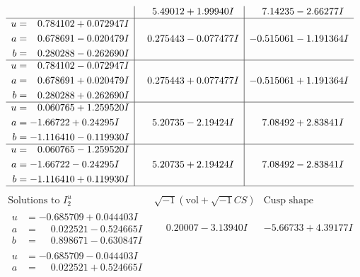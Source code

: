 \documentclass[1p]{elsarticle_modified}
\theoremstyle{definition}
\newcommand{\I}{\sqrt{-1}}
\begin{document}
$$\begin{array}{c|c|c}
 & \phantom{-}5.49012 + 1.99940 I & \phantom{-}7.14235 - 2.66277 I \\ \hline\begin{aligned}
u &= \phantom{-}0.784102 + 0.072947 I \\
a &= \phantom{-}0.678691 - 0.020479 I \\
b &= \phantom{-}0.280288 - 0.262690 I\end{aligned}
 & \phantom{-}0.275443 - 0.077477 I & -0.515061 - 1.191364 I \\ \hline\begin{aligned}
u &= \phantom{-}0.784102 - 0.072947 I \\
a &= \phantom{-}0.678691 + 0.020479 I \\
b &= \phantom{-}0.280288 + 0.262690 I\end{aligned}
 & \phantom{-}0.275443 + 0.077477 I & -0.515061 + 1.191364 I \\ \hline\begin{aligned}
u &= \phantom{-}0.060765 + 1.259520 I \\
a &= -1.66722 + 0.24295 I \\
b &= -1.116410 - 0.119930 I\end{aligned}
 & \phantom{-}5.20735 - 2.19424 I & \phantom{-}7.08492 + 2.83841 I \\ \hline\begin{aligned}
u &= \phantom{-}0.060765 - 1.259520 I \\
a &= -1.66722 - 0.24295 I \\
b &= -1.116410 + 0.119930 I\end{aligned}
 & \phantom{-}5.20735 + 2.19424 I & \phantom{-}7.08492 - 2.83841 I\\
 \hline 
 \end{array}$$\newpage$$\begin{array}{c|c|c}  
\text{Solutions to }I^u_{2}& \I (\text{vol} + \sqrt{-1}CS) & \text{Cusp shape}\\
 \hline 
\begin{aligned}
u &= -0.685709 + 0.044403 I \\
a &= \phantom{-}0.022521 - 0.524665 I \\
b &= \phantom{-}0.898671 - 0.630847 I\end{aligned}
 & \phantom{-}0.20007 - 3.13940 I & -5.66733 + 4.39177 I \\ \hline\begin{aligned}
u &= -0.685709 - 0.044403 I \\
a &= \phantom{-}0.022521 + 0.524665 I \\

\end{aligned}
\end{array}$$
\end{document}
